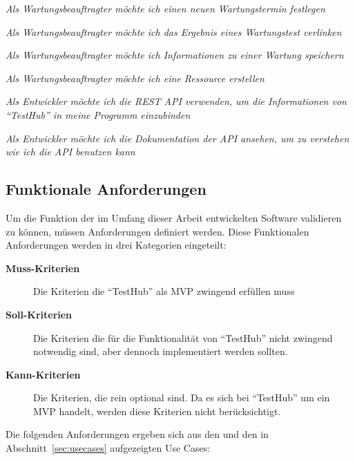 \begin{description}
    \textit{Als Wartungsbeauftragter möchte ich einen neuen Wartungstermin festlegen}

    \textit{Als Wartungsbeauftragter möchte ich das Ergebnis eines Wartungstest verlinken}

    \textit{Als Wartungsbeauftragter möchte ich Informationen zu einer Wartung speichern}

    \textit{Als Wartungsbeauftragter möchte ich eine Ressource erstellen}

    \textit{Als Entwickler möchte ich die REST API verwenden, um die
    Informationen von ``TestHub'' in meine Programm einzubinden}

    \textit{Als Entwickler möchte ich die Dokumentation
    der API ansehen, um zu verstehen wie ich die API benutzen kann}

\end{description}

\subsection{Funktionale Anforderungen}
Um die Funktion der im Umfang dieser Arbeit entwickelten Software validieren zu
können, müssen Anforderungen definiert werden. Diese Funktionalen Anforderungen
werden in drei Kategorien eingeteilt:

\begin{description}
    \item[\textbf{Muss-Kriterien}]Die Kriterien die ``TestHub'' als \gls{MVP} zwingend erfüllen muss

    \item[\textbf{Soll-Kriterien}]Die Kriterien die für die Funktionalität von ``TestHub''
    nicht zwingend notwendig sind, aber dennoch implementiert werden sollten.

    \item[\textbf{Kann-Kriterien}]Die Kriterien, die rein optional sind. Da es sich
    bei ``TestHub'' um ein \gls{MVP} handelt, werden diese Kriterien nicht berücksichtigt.

\end{description}

Die folgenden Anforderungen ergeben sich aus den  und den
in Abschnitt~\ref{sec:usecases} aufgezeigten Use Cases:

